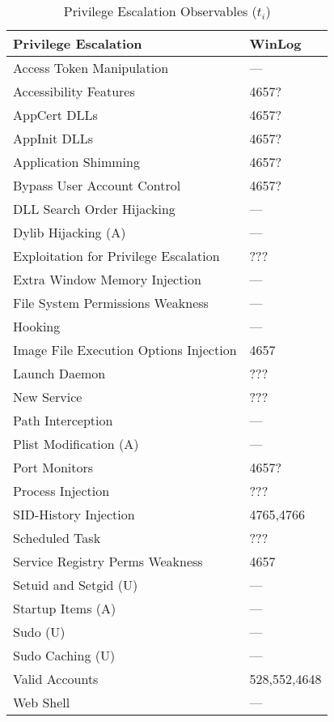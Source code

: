 \documentclass[journal]{IEEEtran}
\begin{document}
\begin{table}
\centering
\caption{Privilege Escalation Observables ($t_{i}$)}
\label{tab:priv-mech}
\begin{tabular}{|l|l|}
\hline
\rowcolor[HTML]{EFEFEF} 
\textbf{Privilege Escalation}     & \textbf{WinLog}  \\\hline
Access Token Manipulation		  & ---    				\\\hline
Accessibility Features			  & 4657?      			\\\hline
AppCert DLLs					  & 4657?      			\\\hline
AppInit DLLs					  & 4657?      			\\\hline
Application Shimming			  & 4657?       			\\\hline
Bypass User Account Control		  & 4657?      			\\\hline						          
DLL Search Order Hijacking		  & ---      			\\\hline
Dylib Hijacking	(A)				  & ---       			\\\hline
Exploitation for Privilege Escalation & ???     			\\\hline
Extra Window Memory Injection	  & ---       			\\\hline
File System Permissions Weakness  & ---      			\\\hline
Hooking						      & ---       			\\\hline
Image File Execution Options Injection & 4657     			\\\hline
Launch Daemon					  & ???       			\\\hline
	New Service					  & ???      			\\\hline
Path Interception				  & ---       			\\\hline
Plist Modification (A)			  & ---     			\\\hline
Port Monitors					  & 4657?      			\\\hline
Process Injection				  & ???      			\\\hline	
SID-History Injection             & 4765,4766  			\\\hline
Scheduled Task                    & ???      			\\\hline	                                  
Service Registry Perms Weakness   & 4657      			\\\hline
Setuid and Setgid (U)			  & ---       			\\\hline
Startup Items (A)				  & ---     			\\\hline
Sudo (U)					      & ---       			\\\hline
Sudo Caching (U)				  & ---      			\\\hline	
Valid Accounts					  & 528,552,4648  		\\\hline
Web Shell					      & ---       			\\\hline
\end{tabular}
\end{table}
\end{document}

